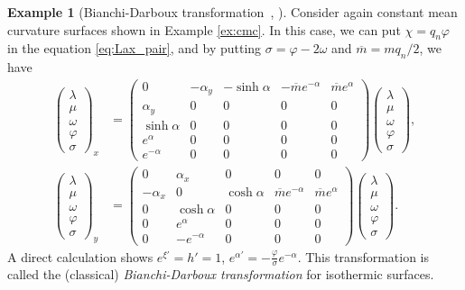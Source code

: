 \documentclass[a4paper]{amsart}
\theoremstyle{definition}
\newtheorem{ex}[thm]{Example}
\begin{document}
\begin{ex}[Bianchi-Darboux transformation~\cite{bianchi_ricerche_1905}, \cite{cieslinski_darboux-bianchi_1997}]
Consider again constant mean curvature surfaces shown in Example \ref{ex:cmc}.
In this case, we can put $\chi = q_n \varphi$ in the equation \eqref{eq:Lax_pair}, and by putting $\sigma = \varphi - 2\omega$ and $\overline{m} = mq_n/2$, we have
\begin{equation}
\begin{aligned}
\begin{pmatrix}
\lambda \\
\mu \\
\omega \\
\varphi \\
\sigma
\end{pmatrix}_x &=
\begin{pmatrix}
0 & -\alpha_y & -\sinh \alpha & -\overline{m}e^{-\alpha} & \overline{m}e^\alpha \\
\alpha_y & 0 & 0 & 0 & 0 \\
\sinh \alpha & 0 & 0 & 0 & 0 \\
e^{\alpha} & 0 & 0 & 0 & 0 \\
e^{-\alpha} & 0 & 0 & 0 & 0
\end{pmatrix}
\begin{pmatrix}
\lambda \\
\mu \\
\omega \\
\varphi \\
\sigma
\end{pmatrix}, \\
%
\begin{pmatrix}
\lambda \\
\mu \\
\omega \\
\varphi \\
\sigma
\end{pmatrix}_y &=
\begin{pmatrix}
0 & \alpha_x & 0 & 0 & 0 \\
-\alpha_x & 0 & \cosh \alpha & \overline{m} e^{-\alpha} & \overline{m} e^\alpha \\
0 & \cosh \alpha & 0 & 0 & 0 \\
0 & e^\alpha & 0 & 0 & 0 \\
0 & -e^{-\alpha} & 0 & 0 & 0
\end{pmatrix}
\begin{pmatrix}
\lambda \\
\mu \\
\omega \\
\varphi \\
\sigma
\end{pmatrix}.
\end{aligned}
\end{equation}
A direct calculation shows $e^{\xi'} = h' = 1$, $e^{\alpha'} = -\frac{\varphi}{\sigma} e^{-\alpha}$.
This transformation is called the (classical) \textit{Bianchi-Darboux transformation} for isothermic surfaces.
\end{ex}
\end{document}
